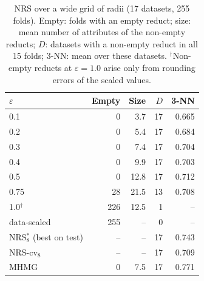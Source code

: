 \begin{table}[!t]
\centering
\caption{NRS over a wide grid of radii (17 datasets, 255 folds). Empty: folds with an empty reduct; size: mean number of attributes of the non-empty reducts; $D$: datasets with a non-empty reduct in all 15 folds; 3-NN: mean over these datasets. $^\dagger$Non-empty reducts at $\varepsilon=1.0$ arise only from rounding errors of the scaled values.}
\label{tab:rad}
\scriptsize
\begin{tabular*}{\columnwidth}{@{\extracolsep{\fill}}lrrrr@{}}
\toprule
$\varepsilon$ & Empty & Size & $D$ & 3-NN \\
\midrule
0.1 & 0 & 3.7 & 17 & 0.665 \\
0.2 & 0 & 5.4 & 17 & 0.684 \\
0.3 & 0 & 7.4 & 17 & 0.704 \\
0.4 & 0 & 9.9 & 17 & 0.703 \\
0.5 & 0 & 12.8 & 17 & 0.712 \\
0.75 & 28 & 21.5 & 13 & 0.708 \\
1.0$^\dagger$ & 226 & 12.5 & 1 & -- \\
data-scaled & 255 & -- & 0 & -- \\
\midrule
NRS$^*_8$ (best on test) & -- & -- & 17 & 0.743 \\
NRS-cv$_8$ & -- & -- & 17 & 0.709 \\
MHMG & 0 & 7.5 & 17 & 0.771 \\
\bottomrule
\end{tabular*}
\end{table}
